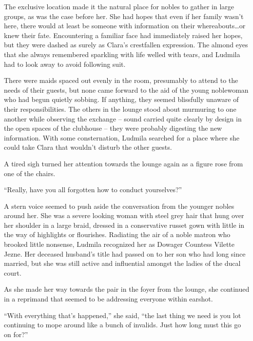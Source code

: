  

The exclusive location made it the natural place for nobles to gather in large groups, as was the case before her. She had hopes that even if her family wasn’t here, there would at least be someone with information on their whereabouts…or knew their fate. Encountering a familiar face had immediately raised her hopes, but they were dashed as surely as Clara's crestfallen expression. The almond eyes that she always remembered sparkling with life welled with tears, and Ludmila had to look away to avoid following suit.

 

There were maids spaced out evenly in the room, presumably to attend to the needs of their guests, but none came forward to the aid of the young noblewoman who had begun quietly sobbing. If anything, they seemed blissfully unaware of their responsibilities. The others in the lounge stood about murmuring to one another while observing the exchange – sound carried quite clearly by design in the open spaces of the clubhouse – they were probably digesting the new information. With some consternation, Ludmila searched for a place where she could take Clara that wouldn’t disturb the other guests.

 

A tired sigh turned her attention towards the lounge again as a figure rose from one of the chairs.

 

“Really, have you all forgotten how to conduct yourselves?”

 

A stern voice seemed to push aside the conversation from the younger nobles around her. She was a severe looking woman with steel grey hair that hung over her shoulder in a large braid, dressed in a conservative russet gown with little in the way of highlights or flourishes. Radiating the air of a noble matron who brooked little nonsense, Ludmila recognized her as Dowager Countess Vilette Jezne. Her deceased husband’s title had passed on to her son who had long since married, but she was still active and influential amongst the ladies of the ducal court.

 

As she made her way towards the pair in the foyer from the lounge, she continued in a reprimand that seemed to be addressing everyone within earshot.

 

“With everything that’s happened,” she said, “the last thing we need is you lot continuing to mope around like a bunch of invalids. Just how long must this go on for?”

